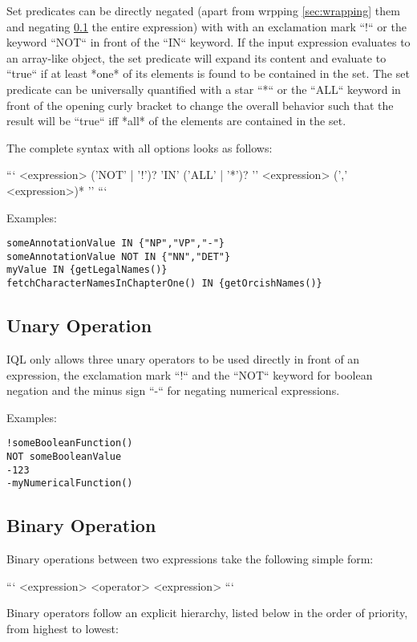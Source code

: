 \documentclass[11pt]{article}
\begin{document}
Set predicates can be directly negated (apart from wrpping \cref{sec:wrapping} them and negating \cref{sec:unary-operation} the entire expression) with with an exclamation mark ``!`` or the keyword ``NOT`` in front of the ``IN`` keyword. If the input expression evaluates to an array-like object, the set predicate will expand its content and evaluate to ``true`` if at least *one* of its elements is found to be contained in the set. The set predicate can be universally quantified with a star ``*`` or the ``ALL`` keyword in front of the opening curly bracket to change the overall behavior such that the result will be ``true`` iff *all* of the elements are contained in the set.

The complete syntax with all options looks as follows: 

```
<expression> ('NOT' | '!')? 'IN' ('ALL' | '*')? '{' <expression> (',' <expression>)* '}' 
```

Examples:

\begin{verbatim}
someAnnotationValue IN {"NP","VP","-"}
someAnnotationValue NOT IN {"NN","DET"}
myValue IN {getLegalNames()}
fetchCharacterNamesInChapterOne() IN {getOrcishNames()}
\end{verbatim}

\subsection{Unary Operation}
\label{sec:unary-operation}

IQL only allows three unary operators to be used directly in front of an expression, the exclamation mark ``!`` and the ``NOT`` keyword for boolean negation and the minus sign ``-`` for negating numerical expressions.

Examples:

\begin{verbatim}
!someBooleanFunction()
NOT someBooleanValue
-123
-myNumericalFunction()
\end{verbatim}

\subsection{Binary Operation}
\label{sec:binary-operation}

Binary operations between two expressions take the following simple form:

```
<expression> <operator> <expression>
```

Binary operators follow an explicit hierarchy, listed below in the order of priority, from highest to lowest:
\end{document}
